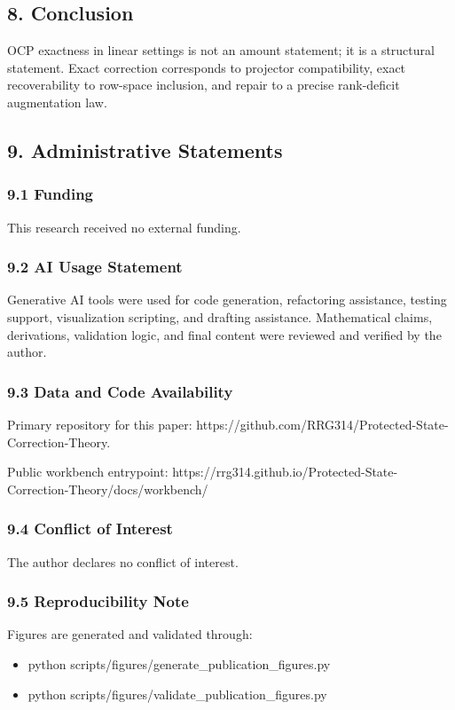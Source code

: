 \documentclass[11pt]{article}
\begin{document}
\subsection*{8. Conclusion}
OCP exactness in linear settings is not an amount statement; it is a structural statement. Exact correction corresponds to projector compatibility, exact recoverability to row-space inclusion, and repair to a precise rank-deficit augmentation law.


\subsection*{9. Administrative Statements}
\subsubsection*{9.1 Funding}
This research received no external funding.


\subsubsection*{9.2 AI Usage Statement}
Generative AI tools were used for code generation, refactoring assistance, testing support, visualization scripting, and drafting assistance. Mathematical claims, derivations, validation logic, and final content were reviewed and verified by the author.


\subsubsection*{9.3 Data and Code Availability}
Primary repository for this paper: https://github.com/RRG314/Protected-State-Correction-Theory.

Public workbench entrypoint: https://rrg314.github.io/Protected-State-Correction-Theory/docs/workbench/


\subsubsection*{9.4 Conflict of Interest}
The author declares no conflict of interest.


\subsubsection*{9.5 Reproducibility Note}
Figures are generated and validated through:

\begin{itemize}
\item python scripts/figures/generate\_publication\_figures.py
\item python scripts/figures/validate\_publication\_figures.py
\end{itemize}
\end{document}
